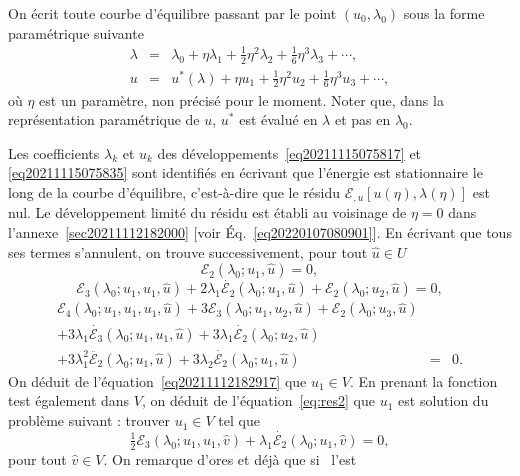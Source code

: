 \documentclass{article}
\begin{document}
On écrit toute courbe d'équilibre passant par le point $(u_0,
λ_0)$ sous la forme paramétrique suivante
\begin{eqnarray}
  λ & = & λ_0 + \eta λ_1 + \tfrac{1}{2} \eta^2 λ_2 +
  \tfrac{1}{6} \eta^3 λ_3 + \cdots,  \label{eq20211115075817}\\
  u & = & u^{\ast} (λ) + \eta u_1 + \tfrac{1}{2} \eta^2 u_2 +
  \tfrac{1}{6} \eta^3 u_3 + \cdots,  \label{eq20211115075835}
\end{eqnarray}
où $\eta$ est un paramètre, non précisé pour le moment. Noter
que, dans la représentation paramétrique de $u$, $u^{\ast}$ est
évalué en $λ$ et pas en $λ_0$.

Les coefficients $λ_k$ et $u_k$ des
développements~\eqref{eq20211115075817} et \eqref{eq20211115075835} sont
identifiés en écrivant que l'énergie est stationnaire le long de
la courbe d'équilibre, c'est-à-dire que le résidu $ℰ_{,
u}  [u (\eta), λ (\eta)]$ est nul. Le développement limité du
résidu est établi au voisinage de $\eta = 0$ dans
l'annexe~\ref{sec20211112182000} [voir Éq.~\eqref{eq20220107080901}]. En
écrivant que tous ses termes s'annulent, on trouve successivement, pour
tout $\hat{u}∈U$
\begin{equation}
  \label{eq20211112182917} ℰ_2 (λ_0 ; u_1, \hat{u}) = 0,
\end{equation}
\begin{equation}
  \label{eq:res2} ℰ_3 (λ_0 ; u_1, u_1, \hat{u}) + 2 λ_1
  \dot{ℰ_2} (λ_0 ; u_1, \hat{u}) +ℰ_2 (λ_0 ;
  u_2, \hat{u}) = 0,
\end{equation}
\begin{eqnarray}
  ℰ_4 (λ_0 ; u_1, u_1, u_1, \hat{u}) + 3ℰ_3
  (λ_0 ; u_1, u_2, \hat{u}) +ℰ_2 (λ_0 ; u_3, \hat{u}) &
  &  \nonumber\\
  + 3 λ_1  \dot{ℰ_3} (λ_0 ; u_1, u_1, \hat{u}) + 3
  λ_1  \dot{ℰ_2} (λ_0 ; u_2, \hat{u}) &  &  \nonumber\\
  + 3 λ_1^2  \ddot{ℰ_2} (λ_0 ; u_1, \hat{u}) + 3
  λ_2  \dot{ℰ_2} (λ_0 ; u_1, \hat{u}) & = & 0.
  \label{eq:res3}
\end{eqnarray}
On déduit de l'équation~\eqref{eq20211112182917} que $u_1∈V$. En
prenant la fonction test également dans $V$, on déduit de
l'équation~\eqref{eq:res2} que $u_1$ est solution du problème suivant
: trouver $u_1∈V$ tel que
\begin{equation}
  \label{eq:bifurcation 1a} \tfrac{1}{2} ℰ_3 (λ_0 ; u_1, u_1,
  \hat{v}) + λ_1  \dot{ℰ_2} (λ_0 ; u_1, \hat{v}) = 0,
\end{equation}
pour tout $\hat{v}∈V$. On remarque d'ores et déjà que si \ l'est
\end{document}
